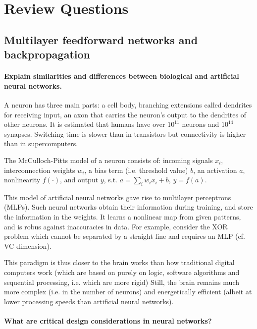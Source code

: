 \section{Review Questions}


\subsection{Multilayer feedforward networks and backpropagation}

\paragraph{Explain similarities and differences between biological and artificial neural networks.}

A neuron has three main parts: a cell body,
branching extensions called dendrites for receiving input,
an axon that carries the neuron's output to the dendrites of other neurons.
It is estimated that humans have over $10^{11}$ neurons and $10^{14}$ synapses.
Switching time is slower than in transistors but connectivity is higher than in supercomputers.

The McCulloch-Pitts model of a neuron consists of:
incoming signals $x_i$,
interconnection weights $w_i$,
a bias term (i.e. threshold value) $b$,
an activation $a$,
nonlinearity $f(\cdot)$,
and output $y$,
s.t.  $a = \sum_i{w_i x_i} + b, \, y = f(a)$.

This model of artificial neural networks gave rise to multilayer perceptrons (MLPs).
Such neural networks obtain their information during training, and store the information in the weights.
It learns a nonlinear map from given patterns, and is robus against inaccuracies in data.
For example, consider the XOR problem which cannot be separated by a straight line and requires an MLP
(cf. VC-dimension).

This paradigm is thus closer to the brain works than how traditional digital computers work
(which are based on purely on logic, software algorithms and sequential processing, i.e. which are more rigid)
Still, the brain remains much more complex (i.e. in the number of neurons) and energetically efficient
(albeit at lower processing speeds than artificial neural networks).

\paragraph{What are critical design considerations in neural networks?}

